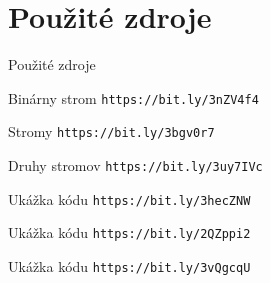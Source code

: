 \documentclass[10pt, hyperref={unicode}]{beamer}
\begin{document}
\section{Použité zdroje}
\begin{frame}{Použité zdroje}
	\begin{thebibliography}{10}
		 Binárny strom
		\newblock \texttt{https://bit.ly/3nZV4f4}
		
		 Stromy
		\newblock \texttt{https://bit.ly/3bgv0r7}
		
		 Druhy stromov
		\newblock \texttt{https://bit.ly/3uy7IVc}
		
		 Ukážka kódu
		\newblock \texttt{https://bit.ly/3hecZNW}
		
		 Ukážka kódu
		\newblock \texttt{https://bit.ly/2QZppi2}
		
		 Ukážka kódu
		\newblock \texttt{https://bit.ly/3vQgcqU}

	\end{thebibliography}
\end{frame}


\end{document}
